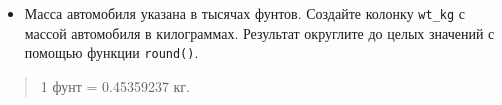 \documentclass[]{book}
\newenvironment{Shaded}{\begin{snugshade}}{\end{snugshade}}
\newcommand{\KeywordTok}[1]{\textcolor[rgb]{0.13,0.29,0.53}{\textbf{#1}}}
\newcommand{\DecValTok}[1]{\textcolor[rgb]{0.00,0.00,0.81}{#1}}
\newcommand{\FloatTok}[1]{\textcolor[rgb]{0.00,0.00,0.81}{#1}}
\newcommand{\StringTok}[1]{\textcolor[rgb]{0.31,0.60,0.02}{#1}}
\newcommand{\OperatorTok}[1]{\textcolor[rgb]{0.81,0.36,0.00}{\textbf{#1}}}
\newcommand{\NormalTok}[1]{#1}
\providecommand{\tightlist}{%
  \setlength{\itemsep}{0pt}\setlength{\parskip}{0pt}}
\begin{document}
\begin{itemize}
\tightlist
\item
  Масса автомобиля указана в тысячах фунтов. Создайте колонку
  \texttt{wt\_kg} с массой автомобиля в килограммах. Результат округлите
  до целых значений с помощью функции \texttt{round()}.
\end{itemize}

\begin{quote}
1 фунт = 0.45359237 кг.
\end{quote}

\begin{Shaded}
\end{Shaded}
\end{document}

